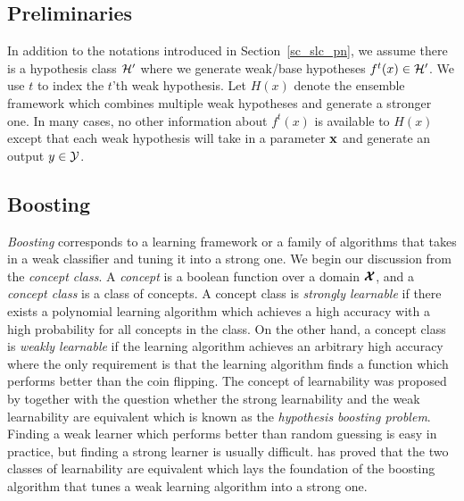 {%
%
\subsection{Preliminaries} \label{sc_em_pn}

In addition to the notations introduced in Section~\ref{sc_slc_pn}, we assume there is a hypothesis class $\mathcal{H}'$ where we generate weak/base hypotheses $f^t(x)\in\mathcal{H}'$.
We use $t$ to index the $t$'th weak hypothesis.
Let $H(x)$ denote the ensemble framework which combines multiple weak hypotheses and generate a stronger one.
In many cases, no other information about $f^t(x)$ is available to $H(x)$ except that each weak hypothesis will take in a parameter $\mathbf {x}$ and generate an output $y\in\mathcal{Y}$.


\subsection{Boosting} \label{sc_boosting}

\textit{Boosting} corresponds to a learning framework or a family of algorithms that takes in a weak classifier and tuning it into a strong one.
We begin our discussion from the \textit{concept class}.
A \textit{concept} is a boolean function over a domain $\pmb {\mathcal{X}}$, and a \textit{concept class} is a class of concepts.
A concept class is \textit{strongly learnable} if there exists a polynomial learning algorithm which achieves a high accuracy with a high probability for all concepts in the class.
On the other hand, a concept class is \textit{weakly learnable} if the learning algorithm achieves an arbitrary high accuracy where the only requirement is that the learning algorithm finds a function which performs better than the coin flipping.
The concept of learnability was proposed by \citet{Kearns94cryptographic} together with the question whether the strong learnability and the weak learnability are equivalent which is known as the \textit{hypothesis boosting problem}.
Finding a weak learner which performs better than random guessing is easy in practice, but finding a strong learner is usually difficult.
\citet{Schapire90the} has proved that the two classes of learnability are equivalent which lays the foundation of the boosting algorithm that tunes a weak learning algorithm into a strong one.

}
